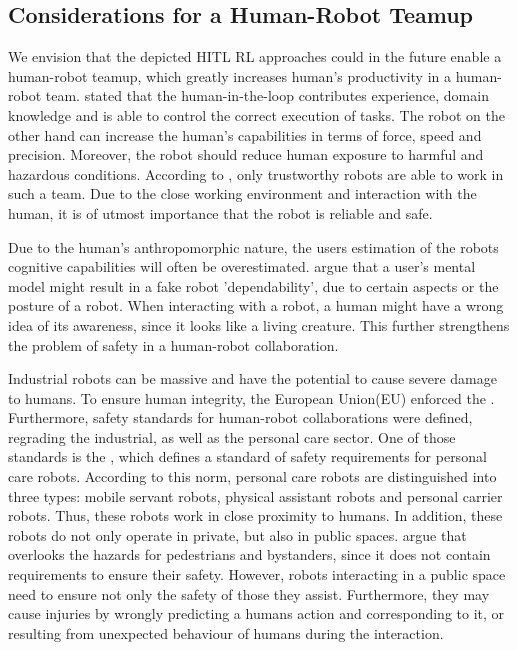 \documentclass[twoside,11pt]{article}
\begin{document}
\subsection{Considerations for a Human-Robot Teamup}

We envision that the depicted HITL RL approaches could in the future enable a human-robot teamup, which greatly increases human's productivity in a human-robot team. \cite{KhatibEtAl:1999:RihEnvironment} stated that the human-in-the-loop contributes experience, domain knowledge and is able to control the correct execution of tasks. The robot on the other hand can increase the human's capabilities in terms of force, speed and precision. Moreover, the robot should reduce human exposure to harmful and hazardous conditions. According to \cite{DeSaintsEtAl:2008:phri}, only trustworthy robots are able to work in such a team. Due to the close working environment and interaction with the human, it is of utmost importance that the robot is reliable and safe.

Due to the human's anthropomorphic nature, the users estimation of the robots cognitive capabilities will often be overestimated. \cite{DeSaintsEtAl:2008:phri} argue that a user's mental model might result in a fake robot 'dependability', due to certain aspects or the posture of a robot. When interacting with a robot, a human might have a wrong idea of its awareness, since it looks like a living creature. This further strengthens the problem of safety in a human-robot collaboration.

Industrial robots can be massive and have the potential to cause severe damage to humans. To ensure human integrity, the European Union(EU) enforced the \cite{EUDirective:2006:Machinery}. Furthermore, safety standards for human-robot collaborations were defined, regrading the industrial, as well as the personal care sector.
One of those standards is the \cite{ISO:13482:2014}, which defines a standard of safety requirements for personal care robots. According to this norm, personal care robots are distinguished into three types: mobile servant robots, physical assistant robots and personal carrier robots. Thus, these robots work in close proximity to humans. In addition, these robots do not only operate in private, but also in public spaces. \cite{SalviniEtAl:2021:ISO13482:2014} argue that \cite{ISO:13482:2014} overlooks the hazards for pedestrians and bystanders, since it does not contain requirements to ensure their safety. However, robots interacting in a public space need to ensure not only the safety of those they assist. Furthermore, they may cause injuries by wrongly predicting a humans action and corresponding to it, or resulting from unexpected behaviour of humans during the interaction.
\end{document}
